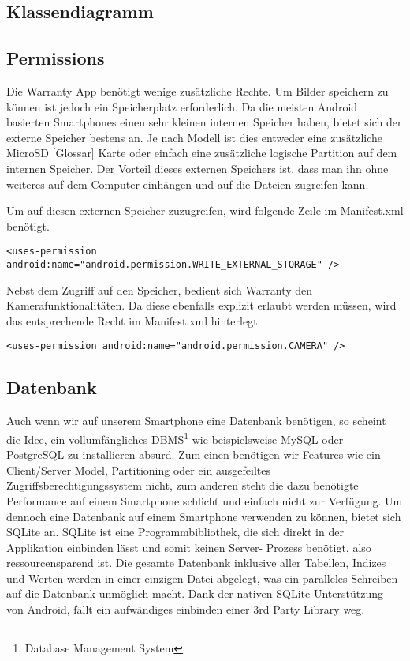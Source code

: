 \subsection{Klassendiagramm}

\subsection{Permissions}
Die Warranty App benötigt wenige zusätzliche Rechte. Um Bilder speichern zu können ist jedoch ein Speicherplatz erforderlich. Da die meisten Android basierten Smartphones einen sehr kleinen internen Speicher haben, bietet sich der externe Speicher bestens an. Je nach Modell ist dies entweder eine zusätzliche MicroSD [Glossar] Karte oder einfach eine zusätzliche logische Partition auf dem internen Speicher. Der Vorteil dieses externen Speichers ist, dass man ihn ohne weiteres auf dem Computer einhängen und auf die Dateien zugreifen kann.

Um auf diesen externen Speicher zuzugreifen, wird folgende Zeile im Manifest.xml benötigt.
\lstset{language=Java, numbers=left}
\begin{lstlisting}
<uses-permission android:name="android.permission.WRITE_EXTERNAL_STORAGE" />
\end{lstlisting}

Nebst dem Zugriff auf den Speicher, bedient sich Warranty den Kamerafunktionalitäten. Da diese ebenfalls explizit erlaubt werden müssen, wird das entsprechende Recht im Manifest.xml hinterlegt.
\lstset{language=Java, numbers=left}
\begin{lstlisting}
<uses-permission android:name="android.permission.CAMERA" />
\end{lstlisting}

\subsection{Datenbank}
Auch wenn wir auf unserem Smartphone eine Datenbank benötigen, so scheint die Idee, ein vollumfängliches DBMS\footnote{Database Management System}  wie beispielsweise MySQL oder PostgreSQL zu installieren absurd. Zum einen benötigen wir Features wie ein Client/Server Model, Partitioning oder ein ausgefeiltes Zugriffsberechtigungssystem nicht, zum anderen steht die dazu benötigte Performance auf einem Smartphone schlicht und einfach nicht zur Verfügung. 
\newline
Um dennoch eine Datenbank auf einem Smartphone verwenden zu können, bietet sich SQLite an. SQLite ist eine Programmbibliothek, die sich direkt in der Applikation einbinden lässt und somit keinen Server- Prozess benötigt, also ressourcensparend ist. Die gesamte Datenbank inklusive aller Tabellen, Indizes und Werten werden in einer einzigen Datei abgelegt, was ein paralleles Schreiben auf die Datenbank unmöglich macht.
\newline
Dank der nativen SQLite Unterstützung von Android, fällt ein aufwändiges einbinden einer 3rd Party Library weg.

